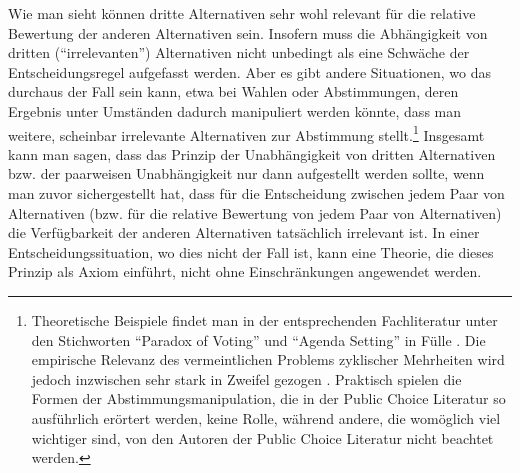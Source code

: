 Wie man sieht können dritte Alternativen sehr wohl relevant für die relative
Bewertung der anderen Alternativen sein. Insofern muss die Abhängigkeit von
dritten ("`irrelevanten"') Alternativen nicht unbedingt als eine Schwäche der
Entscheidungsregel aufgefasst werden. Aber es gibt andere Situationen, wo das
durchaus der Fall sein kann, etwa bei Wahlen oder Abstimmungen, deren Ergebnis
unter Umständen dadurch manipuliert werden könnte, dass man weitere, scheinbar
irrelevante Alternativen zur Abstimmung stellt.\footnote{Theoretische Beispiele
findet man in der entsprechenden Fachliteratur unter den Stichworten "`Paradox of
Voting"' und "`Agenda Setting"' in Fülle \cite[S. 112ff.]{mueller:2003}. Die
empirische Relevanz des vermeintlichen Problems zyklischer Mehrheiten wird jedoch
inzwischen sehr stark in Zweifel gezogen \cite[S. 147ff.]{green-shapiro:1994}.
Praktisch spielen die Formen der Abstimmungsmanipulation, die in der Public
Choice Literatur so ausführlich erörtert werden, keine Rolle, während andere, die
womöglich viel wichtiger sind, von den Autoren der Public Choice Literatur nicht
beachtet werden.} Insgesamt kann man sagen, dass das Prinzip der
Unabhängigkeit von dritten Alternativen bzw. der paarweisen Unabhängigkeit nur
dann aufgestellt werden sollte, wenn man zuvor sichergestellt hat, dass für die
Entscheidung zwischen jedem Paar von Alternativen (bzw. für die relative
Bewertung von jedem Paar von Alternativen) die Verfügbarkeit der anderen
Alternativen tatsächlich irrelevant ist. In einer Entscheidungssituation, wo
dies nicht der Fall ist, kann eine Theorie, die dieses Prinzip als Axiom
einführt, nicht ohne Einschränkungen angewendet werden.


